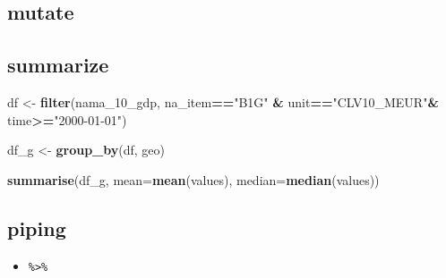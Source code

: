 \documentclass[]{article}
\newenvironment{Shaded}{\begin{snugshade}}{\end{snugshade}}
\newcommand{\KeywordTok}[1]{\textcolor[rgb]{0.13,0.29,0.53}{\textbf{#1}}}
\newcommand{\DataTypeTok}[1]{\textcolor[rgb]{0.13,0.29,0.53}{#1}}
\newcommand{\StringTok}[1]{\textcolor[rgb]{0.31,0.60,0.02}{#1}}
\newcommand{\OperatorTok}[1]{\textcolor[rgb]{0.81,0.36,0.00}{\textbf{#1}}}
\newcommand{\NormalTok}[1]{#1}
\providecommand{\tightlist}{%
  \setlength{\itemsep}{0pt}\setlength{\parskip}{0pt}}
\begin{document}
\subsection{mutate}\label{mutate}

\begin{Shaded}
\end{Shaded}

\subsection{summarize}\label{summarize}

\begin{Shaded}
\begin{Highlighting}[]
\NormalTok{df <-}\StringTok{ }\KeywordTok{filter}\NormalTok{(nama_10_gdp, }
\NormalTok{             na_item}\OperatorTok{==}\StringTok{"B1G"} \OperatorTok{&}
\StringTok{             }\NormalTok{unit}\OperatorTok{==}\StringTok{"CLV10_MEUR"}\OperatorTok{&}
\StringTok{             }\NormalTok{time}\OperatorTok{>=}\StringTok{"2000-01-01"}\NormalTok{)}

\NormalTok{df_g <-}\StringTok{ }\KeywordTok{group_by}\NormalTok{(df, geo)}

\KeywordTok{summarise}\NormalTok{(df_g, }\DataTypeTok{mean=}\KeywordTok{mean}\NormalTok{(values), }\DataTypeTok{median=}\KeywordTok{median}\NormalTok{(values))}
\end{Highlighting}
\end{Shaded}

\subsection{piping}\label{piping}

\begin{itemize}
\tightlist
\item
  \texttt{\%\textgreater{}\%}
\end{itemize}
\end{document}
